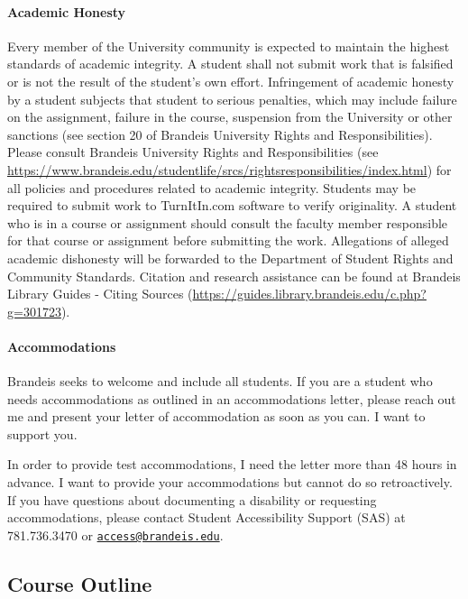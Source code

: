 \documentclass[
]{article}
\begin{document}
\hypertarget{academic-honesty}{%
\paragraph{Academic Honesty}\label{academic-honesty}}

Every member of the University community is expected to maintain the
highest standards of academic integrity. A student shall not submit work
that is falsified or is not the result of the student's own effort.
Infringement of academic honesty by a student subjects that student to
serious penalties, which may include failure on the assignment, failure
in the course, suspension from the University or other sanctions (see
section 20 of Brandeis University Rights and Responsibilities). Please
consult Brandeis University Rights and Responsibilities (see
\url{https://www.brandeis.edu/studentlife/srcs/rightsresponsibilities/index.html})
for all policies and procedures related to academic integrity. Students
may be required to submit work to TurnItIn.com software to verify
originality. A student who is in a course or assignment should consult
the faculty member responsible for that course or assignment before
submitting the work. Allegations of alleged academic dishonesty will be
forwarded to the Department of Student Rights and Community Standards.
Citation and research assistance can be found at Brandeis Library Guides
- Citing Sources
(\url{https://guides.library.brandeis.edu/c.php?g=301723}).

\hypertarget{accommodations}{%
\paragraph{Accommodations}\label{accommodations}}

Brandeis seeks to welcome and include all students. If you are a student
who needs accommodations as outlined in an accommodations letter, please
reach out me and present your letter of accommodation as soon as you
can. I want to support you.

In order to provide test accommodations, I need the letter more than 48
hours in advance. I want to provide your accommodations but cannot do so
retroactively. If you have questions about documenting a disability or
requesting accommodations, please contact Student Accessibility Support
(SAS) at 781.736.3470 or
\href{mailto:access@brandeis.edu}{\nolinkurl{access@brandeis.edu}}.

\hypertarget{course-outline}{%
\subsection{Course Outline}\label{course-outline}}
\end{document}
